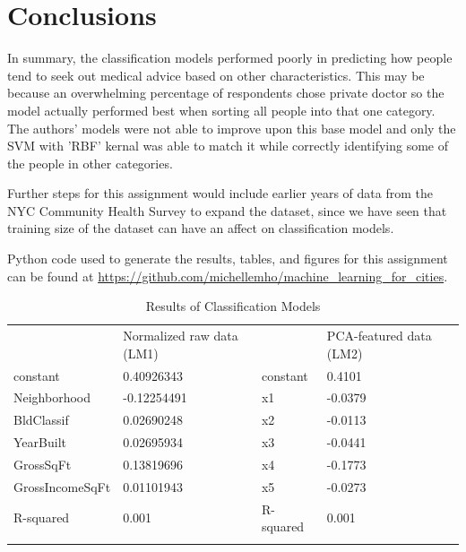 \documentclass[10pt,twocolumn]{article}
\begin{document}
\section{Conclusions}

In summary, the classification models performed poorly in predicting
how people tend to seek out medical advice based on other characteristics. This
may be because an overwhelming percentage of respondents chose private doctor so
the model actually performed best when sorting all people into that one category.
The authors' models were not able to improve upon this base model and only the
SVM with 'RBF' kernal was able to match it while correctly identifying some of the
people in other categories.

Further steps for this assignment would include earlier years of data from the
NYC Community Health Survey to expand the dataset, since we have seen that training
size of the dataset can have an affect on classification models.

Python code used to generate the results, tables, and figures for this assignment can be
found at \url{https://github.com/michellemho/machine_learning_for_cities}.

\begin{center}
\begin{table}[]
\centering
\caption{Results of Classification Models}
\label{my-label}
\begin{tabular}{lllll}
                & Normalized raw data (LM1) &          & PCA-featured data (LM2) & \\
constant        & 0.40926343                & constant & 0.4101                  & \\
Neighborhood    & -0.12254491               & x1       & -0.0379                 & \\
BldClassif      & 0.02690248                & x2       & -0.0113                 & \\
YearBuilt       & 0.02695934                & x3       & -0.0441                 & \\
GrossSqFt       & 0.13819696                & x4       & -0.1773                 & \\
GrossIncomeSqFt & 0.01101943                & x5       & -0.0273                 & \\
R-squared       & 0.001                     & R-squared& 0.001                   & \\
                &                           &          &                         &
\end{tabular}
\end{table}
\end{center}
\end{document}
